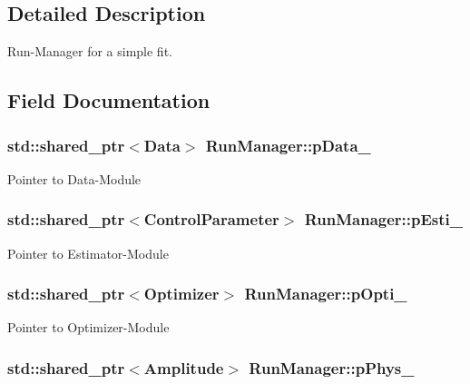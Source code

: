 \subsection{Detailed Description}
Run-\/\-Manager for a simple fit. 

\subsection{Field Documentation}
\hypertarget{class_run_manager_ac5567c21ce343a46afb025643aa7add0}{
\subsubsection[{p\-Data\-\_\-}]{\setlength{\rightskip}{0pt plus 5cm}std\-::shared\-\_\-ptr$<${\bf Data}$>$ Run\-Manager\-::p\-Data\-\_\-\hspace{0.3cm}{\ttfamily [protected]}}}\label{class_run_manager_ac5567c21ce343a46afb025643aa7add0}
Pointer to Data-\/\-Module \hypertarget{class_run_manager_a37ed02a3d6f47131ef7e52a20816d48a}{
\subsubsection[{p\-Esti\-\_\-}]{\setlength{\rightskip}{0pt plus 5cm}std\-::shared\-\_\-ptr$<${\bf Control\-Parameter}$>$ Run\-Manager\-::p\-Esti\-\_\-\hspace{0.3cm}{\ttfamily [protected]}}}\label{class_run_manager_a37ed02a3d6f47131ef7e52a20816d48a}
Pointer to Estimator-\/\-Module \hypertarget{class_run_manager_a55757983ceeeb8b4d687123e9804f6fc}{
\subsubsection[{p\-Opti\-\_\-}]{\setlength{\rightskip}{0pt plus 5cm}std\-::shared\-\_\-ptr$<${\bf Optimizer}$>$ Run\-Manager\-::p\-Opti\-\_\-\hspace{0.3cm}{\ttfamily [protected]}}}\label{class_run_manager_a55757983ceeeb8b4d687123e9804f6fc}
Pointer to Optimizer-\/\-Module \hypertarget{class_run_manager_a27ed6052f42c745bed63626b65f8dc77}{
\subsubsection[{p\-Phys\-\_\-}]{\setlength{\rightskip}{0pt plus 5cm}std\-::shared\-\_\-ptr$<${\bf Amplitude}$>$ Run\-Manager\-::p\-Phys\-\_\-\hspace{0.3cm}{\ttfamily [protected]}}}\label{class_run_manager_a27ed6052f42c745bed63626b65f8dc77}
